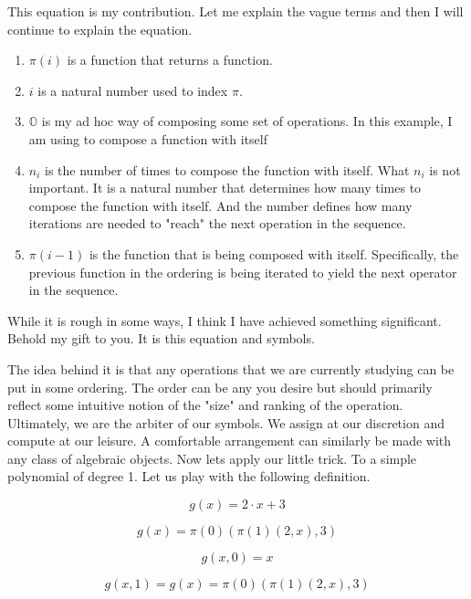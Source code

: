 This equation is my contribution. Let me explain the vague terms and then I
will continue to explain the equation.

\begin{enumerate}
    \item $\pi(i)$ is a function that returns a function.
    \item $i$ is a natural number used to index $\pi$.
    \item $\mathbb{O}$ is my ad hoc way of composing some set of operations. In
          this example, I am using to compose a function with itself
    \item $n_i$ is the number of times to compose the function with itself. What
          $n_i$ is not important. It is a natural number that determines how many
          times to compose the function with itself. And the number defines how many
          iterations are needed to "reach" the next operation in the sequence.
    \item $\pi(i-1)$ is the function that is being composed with itself.
          Specifically, the previous function in the ordering is being iterated to
          yield the next operator in the sequence.
\end{enumerate}

While it is rough in some ways, I think I have achieved something significant.
Behold my gift to you. It is this equation and symbols.

The idea behind it is that any operations that we are currently studying can be
put in some ordering. The order can be any you desire but should primarily
reflect some intuitive notion of the "size" and ranking of the operation.
Ultimately, we are the arbiter of our symbols. We assign at our discretion and
compute at our leisure. A comfortable arrangement can similarly be made with
any class of algebraic objects. Now lets apply our little trick. To a simple
polynomial of degree 1. Let us play with the following definition.

\begin{equation}
    g(x) = 2 \cdot x + 3
\end{equation}

\begin{equation}
    g(x) = \pi(0)(\pi(1)(2,x), 3)
\end{equation}

\begin{equation}
    g(x,0) = x
\end{equation}

\begin{equation}
    g(x,1) = g(x) = \pi(0)(\pi(1)(2,x), 3)
\end{equation}

